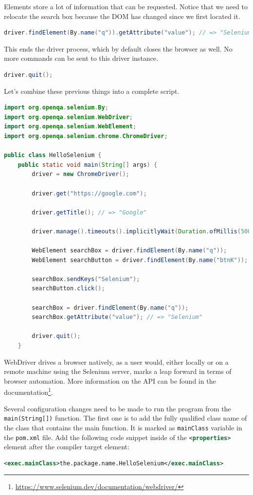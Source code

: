 Elements store a lot of information that can be requested. Notice that we need to relocate the search box because the DOM has changed since we first located it.
\begin{lstlisting}[language=java]
driver.findElement(By.name("q")).getAttribute("value"); // => "Selenium"
\end{lstlisting}

This ends the driver process, which by default closes the browser as well. No more commands can be sent to this driver instance.
\begin{lstlisting}[language=java]
driver.quit();
\end{lstlisting}

Let’s combine these previous things into a complete script.
\begin{lstlisting}[language=java,caption={The complete example to open Google and search for Selenium.}]
import org.openqa.selenium.By;
import org.openqa.selenium.WebDriver;
import org.openqa.selenium.WebElement;
import org.openqa.selenium.chrome.ChromeDriver;

public class HelloSelenium {
    public static void main(String[] args) {
        driver = new ChromeDriver();

        driver.get("https://google.com");
        
        driver.getTitle(); // => "Google"

        driver.manage().timeouts().implicitlyWait(Duration.ofMillis(500));
        
        WebElement searchBox = driver.findElement(By.name("q"));
        WebElement searchButton = driver.findElement(By.name("btnK"));
        
        searchBox.sendKeys("Selenium");
        searchButton.click();
        
        searchBox = driver.findElement(By.name("q"));
        searchBox.getAttribute("value"); // => "Selenium"
        
        driver.quit();
    }
\end{lstlisting}

WebDriver drives a browser natively, as a user would, either locally or on a remote machine using the Selenium server, marks a leap forward in terms of browser automation. More information on the API can be found in the documentation\footnote{\url{https://www.selenium.dev/documentation/webdriver/}}.

Several configuration changes need to be made to run the program from the \lstinline!main(String[])! function. The first one is to add the fully qualified class name of the class that contains the main function. It is marked as \lstinline!mainClass! variable in the \lstinline!pom.xml! file. Add the following code snippet inside of the \lstinline[language=XML]!<properties>! element after the compiler target element:
\begin{lstlisting}[language=XML]
<exec.mainClass>the.package.name.HelloSelenium</exec.mainClass>
\end{lstlisting}


